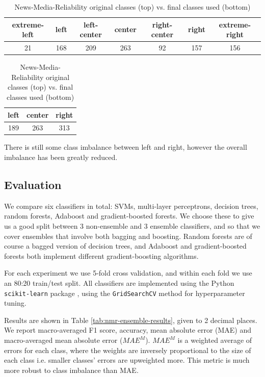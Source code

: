 \begin{table}[h]
    \begin{center}
        \begin{tabular}{|c|c|c|c|c|c|c|}
            \hline
            extreme-left & left & left-center & center & right-center & right & extreme-right \\
            \hline
            21 & 168 & 209 & 263 & 92 & 157 & 156 \\
            \hline
        \end{tabular}
    \end{center} \vspace{5pt}
    \begin{center}
        \begin{tabular}{|c|c|c|}
            \hline
            left & center & right \\
            \hline
            189 & 263 & 313 \\
            \hline
        \end{tabular}
    \end{center}
    \caption{News-Media-Reliability original classes (top) vs. final classes used (bottom)}
    \label{tab:nmr-class-balancing}
\end{table}

There is still some class imbalance between left and right, however the overall imbalance has been greatly reduced.

\subsection{Evaluation}

We compare six classifiers in total: SVMs, multi-layer perceptrons, decision trees, random forests, Adaboost and gradient-boosted forests. We choose these to give us a good split between 3 non-ensemble and 3 ensemble classifiers, and so that we cover ensembles that involve both bagging and boosting. Random forests are of course a bagged version of decision trees, and Adaboost and gradient-boosted forests both implement different gradient-boosting algorithms.

For each experiment we use 5-fold cross validation, and within each fold we use an 80:20 train/test split. All classifiers are implemented using the Python \texttt{scikit-learn} package \cite{sklearn}, using the \texttt{GridSearchCV} method for hyperparameter tuning.

Results are shown in Table \ref{tab:nmr-ensemble-results}, given to 2 decimal places. We report macro-averaged F1 score, accuracy, mean absolute error (MAE) and macro-averaged mean absolute error ($ MAE^M $). $ MAE^M $ is a weighted average of errors for each class, where the weights are inversely proportional to the size of each class i.e. smaller classes' errors are upweighted more. This metric is much more robust to class imbalance than MAE.


